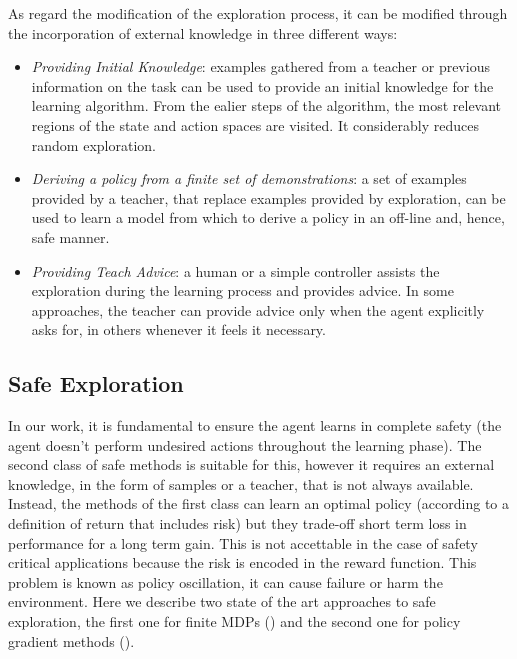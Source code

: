 As regard the modification of the exploration process, it can be modified through the incorporation of external knowledge in three different ways:
\begin{itemize}
	\item \emph{Providing Initial Knowledge}: examples gathered from a teacher or previous information on the task can be used to provide an initial knowledge for the learning algorithm. From the ealier steps of the algorithm, the most relevant regions of the state and action spaces are visited. It considerably reduces random exploration.
	\item \emph{Deriving a policy from a finite set of demonstrations}: a set of examples provided by a teacher, that replace examples provided by exploration, can be used to learn a model from which to derive a policy in an off-line and, hence, safe manner.
	\item \emph{Providing Teach Advice}: a human or a simple controller assists the exploration during the learning process and provides advice. In some approaches, the teacher can provide advice only when the agent explicitly asks for, in others whenever it feels it necessary. 
\end{itemize}

\subsection{Safe Exploration}
In our work, it is fundamental to ensure the agent learns in complete safety (\ie the agent doesn't perform undesired actions throughout the learning phase). The second class of safe methods is suitable for this, however it requires an external knowledge, in the form of samples or a teacher, that is not always available. Instead, the methods of the first class can learn an optimal policy (according to a definition of return that includes risk) but they trade-off short term loss in performance for a long term gain. This is not accettable in the case of safety critical applications because the risk is encoded in the reward function. This problem is known as policy oscillation, it can cause failure or harm the environment. Here we describe two state of the art approaches to safe exploration, the first one for finite \ac{MDPs} () and the second one for policy gradient methods ().

